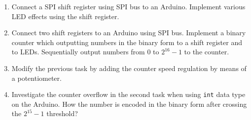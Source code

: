 \documentclass[../sparc.tex]{subfiles}
\begin{document}
\begin{enumerate}
\item Connect a SPI shift register using SPI bus to an Arduino.  Implement
  various LED effects using the shift register.
\item Connect two shift registers to an Arduino using SPI bus.  Implement a
  binary counter which outputting numbers in the binary form to a shift register
  and to LEDs.  Sequentially output numbers from 0 to $2^{16} - 1$ to the counter.
\item Modify the previous task by adding the counter speed regulation by means
  of a potentiometer.
\item Investigate the counter overflow in the second task when using
  \texttt{int} data type on the Arduino.  How the number is encoded in
  the binary form after crossing the $2^{15} - 1$ threshold?
\end{enumerate}
\end{document}
